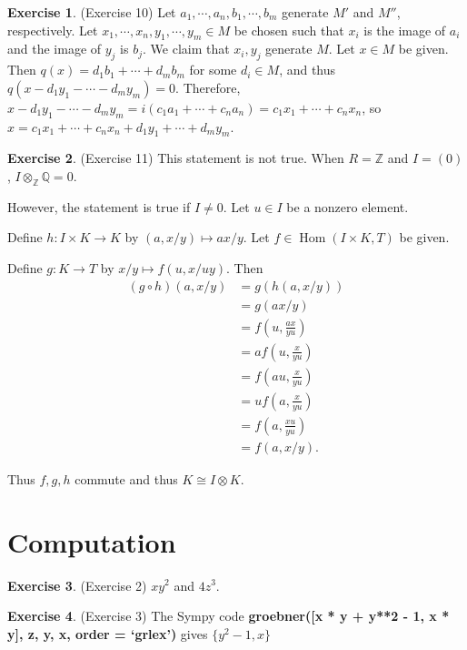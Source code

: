 \documentclass[12pt, psamsfonts]{amsart}
\theoremstyle{definition}
\newtheorem*{exer}{Exercise}
\theoremstyle{remark}
\DeclareMathOperator{\Hom}{Hom}
\numberwithin{equation}{section}
\begin{document}
\begin{exer}{(Exercise 10)}
  Let $a_1, \cdots, a_n, b_1, \cdots, b_m$ generate $M'$ and $M''$, respectively.
  Let $x_1, \cdots, x_n, y_1, \cdots, y_m \in M$ be chosen such that $x_i$ is the image of $a_i$ and the image of $y_j$ is $b_j$.
  We claim that $x_i, y_j$ generate $M$.
  Let $x \in M$ be given.
  Then $q(x) = d_1b_1 + \cdots + d_mb_m$ for some $d_i \in M$, and thus $q(x - d_1y_1 - \cdots - d_my_m) = 0$.
  Therefore, $x - d_1y_1 - \cdots - d_my_m = i(c_1a_1 + \cdots + c_na_n) = c_1x_1 + \cdots + c_nx_n$, so $x = c_1x_1 + \cdots + c_nx_n + d_1y_1 + \cdots + d_my_m$.
\end{exer}

\begin{exer}{(Exercise 11)}
  This statement is not true.
  When $R = \mathbb{Z}$ and $I = (0)$, $I \otimes_{\mathbb{Z}} \mathbb{Q} = 0$.

  However, the statement is true if $I \ne 0$.
  Let $u \in I$ be a nonzero element.

  Define $h: I \times K \rightarrow K$ by $(a, x / y) \mapsto ax / y$.
  Let $f \in \Hom(I \times K, T)$ be given.

  Define $g: K \rightarrow T$ by $x / y \mapsto f(u, x / uy)$.
  Then 
  \begin{align*}
    (g \circ h)(a, x / y)
      &= g(h(a, x / y)) \\
      &= g(ax / y) \\
      &= f(u, \frac{ax}{yu}) \\
      &= af(u, \frac{x}{yu}) \\
      &= f(au, \frac{x}{yu}) \\
      &= uf(a, \frac{x}{yu}) \\
      &= f(a, \frac{xu}{yu}) \\
      &= f(a, x/y).
  \end{align*}

  Thus $f, g, h$ commute and thus $K \cong I \otimes K$.
\end{exer}

\section{Computation}

\begin{exer}{(Exercise 2)}
  $xy^2$ and $4z^3$.
\end{exer}

\begin{exer}{(Exercise 3)}
  The Sympy code \textbf{groebner([x * y + y**2 - 1, x * y], z, y, x, order = `grlex')} gives $\{ y^2 - 1, x \}$
\end{exer}
\end{document}
